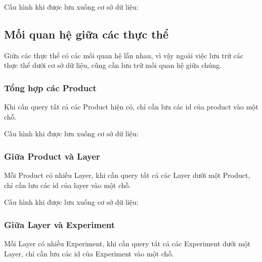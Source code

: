 Cấu hình khi được lưu xuống cơ sở dữ liệu:

\begin{itemize}
\end{itemize}

\subsection{Mối quan hệ giữa các thực thể}

Giữa các thực thể có các mối quan hệ lẫn nhau, vì vậy ngoài việc lưu trữ các thực thể dưới
cơ sở dữ liệu, cũng cần lưu trữ mối quan hệ giữa chúng.

\subsubsection{Tổng hợp các Product}

Khi cần query tất cả các Product hiện có, chỉ cần lưu các id của product vào một chỗ.

Cấu hình khi được lưu xuống cơ sở dữ liệu:

\begin{itemize}
\end{itemize}

\subsubsection{Giữa Product và Layer}

Mỗi Product có nhiều Layer, khi cần query tất cả các Layer dưới một Product, chỉ cần lưu
các id của layer vào một chỗ.

Cấu hình khi được lưu xuống cơ sở dữ liệu:

\begin{itemize}
\end{itemize}

\subsubsection{Giữa Layer và Experiment}

Mỗi Layer có nhiều Experiment, khi cần query tất cả các Experiment dưới một Layer, chỉ cần lưu
các id của Experiment vào một chỗ.


